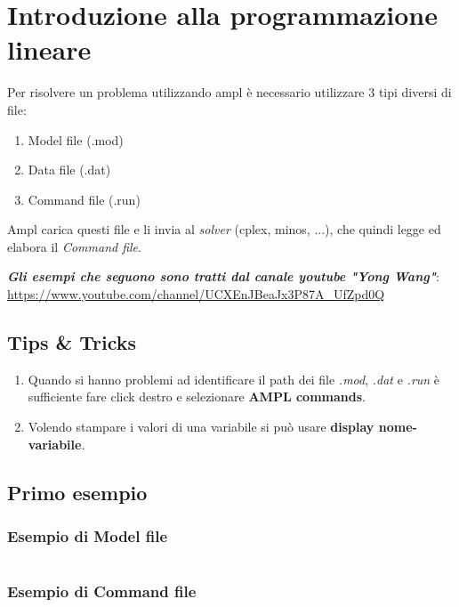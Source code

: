 \documentclass[\main/main.tex]{subfiles}
\begin{document}
%

\section{Introduzione alla programmazione lineare}
Per risolvere un problema utilizzando ampl è necessario utilizzare 3 tipi diversi di file:

\begin{enumerate}
  \item Model file (.mod)
  \item Data file (.dat)
  \item Command file (.run)
\end{enumerate}

Ampl carica questi file e li invia al \textit{solver} (cplex, minos, ...), che quindi legge ed elabora il \textit{Command file}.

\vspace{1em}
\textbf{\textit{Gli esempi che seguono sono tratti dal canale youtube "Yong Wang"}}: \url{https://www.youtube.com/channel/UCXEnJBeaJx3P87A_UfZpd0Q}

\subsection{Tips \& Tricks}
\begin{enumerate}
  \item Quando si hanno problemi ad identificare il path dei file \textit{.mod}, \textit{.dat} e \textit{.run} è sufficiente fare click destro e selezionare \textbf{AMPL commands}.
  \item Volendo stampare i valori di una variabile si può usare \textbf{display nome-variabile}.
\end{enumerate}

\subsection{Primo esempio}

\subsubsection{Esempio di Model file}
\inputminted{ampl}{\main/chapters/ampl/es1/example1.mod}

\subsubsection{Esempio di Command file}
\inputminted{ampl}{\main/chapters/ampl/es1/example1.run}
\end{document}
